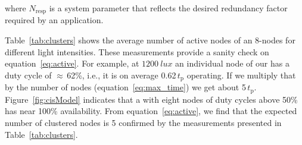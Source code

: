 where $N_\text{resp}$ is a system parameter that reflects the desired redundancy factor required by an application. 


Table~\ref{tab:clusters} shows the average number of active nodes of an 8-nodes \cis for different light intensities. These measurements provide a sanity check on equation~\ref{eq:active}. For example, at $\SI{1200}{lux}$ an individual node of our \cis has a duty cycle of $\approx$\,62\%, i.e., it is on average 0.62\,$t_\text{p}$ operating. If we multiply that by the number of nodes (equation~\ref{eq:max_time}) we get about 5\,$t_\text{p}$. Figure~\ref{fig:cisModel} indicates that a \cis with eight nodes of duty cycles above 50\% has near 100\% availability. From equation~\ref{eq:active}, we find that the expected number of clustered nodes is 5 confirmed by the measurements presented in Table~\ref{tab:clusters}. 







































